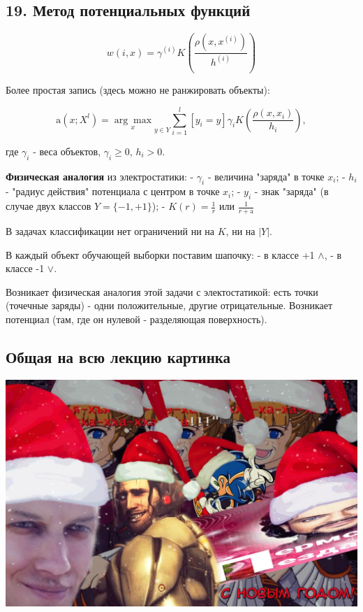 \subsection{19. Метод потенциальных функций}

$$w(i, x) = \gamma^{(i)} K{\left( \frac{\rho(x, x^{(i)})}{h^{(i)}}
\right)}$$

Более простая запись (здесь можно не ранжировать объекты):

$$\text{a}(x;X^l) = {\underset{x}{\arg\max}}_{y \in Y} \sum_{i=1}^l{\left[ y_i = y \right]
\gamma_i K \left( \frac{\rho(x, x_i)}{h_i} \right)},$$

где $\gamma_i$ - веса объектов, $\gamma_i \geqslant 0$, $h_i > 0$.

\textbf{Физическая аналогия} из электростатики:
- $\gamma_i$ - величина "заряда" в точке $x_i$;
- $h_i$ - "радиус действия" потенциала с центром в точке $x_i$;
- $y_i$ - знак "заряда" (в случае двух классов $Y = \{ -1, +1 \}$);
- $K(r) = \frac{1}{r}$ или $\frac{1}{r+\text{a}}$

В задачах классификации нет ограничений ни на $K$, ни на $|Y|$.

В каждый объект обучающей выборки поставим шапочку:
- в классе +1 $\wedge$,
- в классе -1 $\vee$.

Возникает физическая аналогия этой задачи с электостатикой:
есть точки (точечные заряды) - одни положительные, другие отрицательные.
Возникает потенциал (там, где он нулевой - разделяющая поверхность).

\subsection{Общая на всю лекцию картинка}

\includegraphics[scale=0.3]{figures/samplefigure.jpg}

